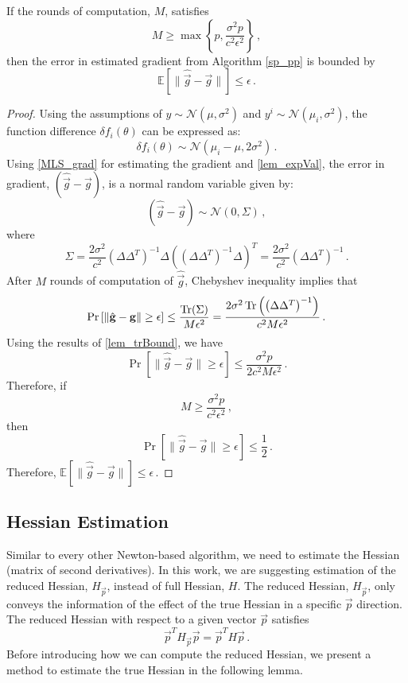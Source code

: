 \begin{theorem}
If the rounds of computation, $M$, satisfies
\begin{equation} \label{Nparallel}
M \geq \max \left\{p,\frac{\sigma^2 p}{c^2\epsilon^2}\right\}\,,
\end{equation}
then the error in estimated gradient from Algorithm \ref{sp_pp} is bounded by
$$ \mathbb{E} \left[ \| \hat{\vec{g}}- \vec{g}\| \right] \leq \epsilon \,.$$
\end{theorem}

\begin{proof}
Using the assumptions of $y \sim \mathcal{N}(\mu,\sigma^2)$ and $y^i \sim \mathcal{N}(\mu_i,\sigma^2)$, the function difference $\delta f_i(\theta)$ can be expressed as:
$$\delta f_i(\theta) \sim \mathcal{N}( \mu_i-\mu,2\sigma^2)\,.$$
Using \eqref{MLS_grad} for estimating the gradient and \cref{lem_expVal}, the error in gradient, $(\hat{\vec{g}} - \vec{g})$, is a normal random variable given by:
$$ (\hat{\vec{g}} - \vec{g}) \sim \mathcal{N} (0,\Sigma) \,,$$
where
$$ \Sigma= \frac{2\sigma^2}{c^2} \left(\Delta \Delta^T \right)^{-1} \Delta \left( \left(\Delta \Delta^T \right)^{-1} \Delta \right)^T = \frac{2\sigma^2}{c^2} \left(\Delta \Delta^T \right)^{-1} \,.$$
After $M$ rounds of computation of $\hat{\vec{g}}$, Chebyshev inequality implies that
$$ \Pr \left[ \| \hat{\mathbf{g}} - \mathbf{g} \| \geq \epsilon \right] \leq \frac{\operatorname{Tr}(\Sigma)}{M \epsilon^2} = \frac{2 \sigma^2 \operatorname{Tr} \left(\left(\Delta \Delta^T \right)^{-1}\right)}{c^2 M \epsilon^2} \,.$$
Using the results of \cref{lem_trBound}, we have
$$ \Pr \left[ \| \hat{\vec{g}} - \vec{g} \| \geq \epsilon \right] \leq \frac{\sigma^2 p}{2c^2 M \epsilon^2} \,.$$
Therefore, if 
$$M \geq \frac{\sigma^2 p}{c^2\epsilon^2}\,,$$
then 
$$ \Pr \left[ \| \hat{\vec{g}} - \vec{g} \| \geq \epsilon \right] \leq \frac{1}{2} \,.$$
Therefore, $\displaystyle \mathbb{E}  \left[ \| \hat{\vec{g}} - \vec{g} \| \right] \leq \epsilon\,.$
\end{proof}

\subsection{Hessian Estimation}

Similar to every other Newton-based algorithm, we need to estimate the Hessian (matrix of second derivatives). In this work, we are suggesting estimation of the reduced Hessian, $H_{\vec{p}}$, instead of full Hessian, $H$. The reduced Hessian, $H_{\vec{p}}$, only conveys the information of the effect of the true Hessian in a specific $\vec{p}$ direction. The reduced Hessian with respect to a given vector $\vec{p}$ satisfies
$$ \vec{p}^T H_{\vec{p}} \vec{p} = \vec{p}^T H \vec{p}\,. $$
Before introducing how we can compute the reduced Hessian, we present a method to estimate the true Hessian in the following lemma.

